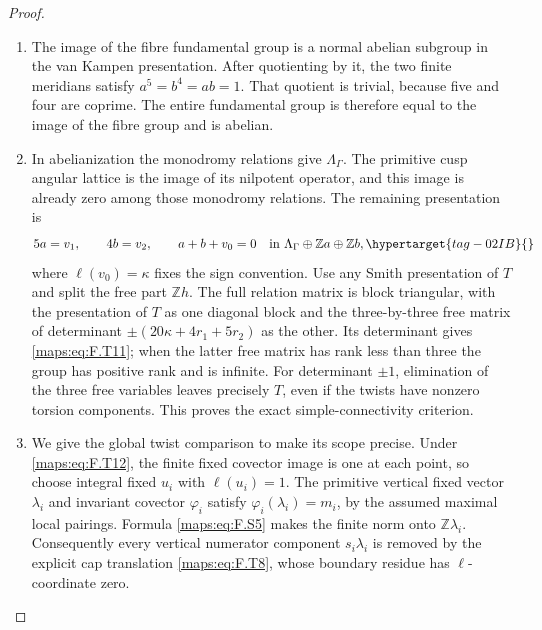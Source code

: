\documentclass[11pt,a4paper]{article}
\numberwithin{equation}{section}
\theoremstyle{definition}
\begin{document}
\begin{proof}
\begin{enumerate}[label=\arabic*.]
\item The image of the fibre fundamental group is a normal
abelian subgroup in the van Kampen presentation.
After quotienting by it, the two finite meridians satisfy
$a^5=b^4=ab=1$.
That quotient is trivial, because five and four are coprime.
The entire fundamental group is therefore equal to the
image of the fibre group and is abelian.

\item In abelianization the monodromy relations give
$\Lambda_\Gamma$.
The primitive cusp angular lattice is the image of its
nilpotent operator, and this image is already zero among
those monodromy relations.
The remaining presentation is
\begin{equation}
 5a=v_1,\qquad4b=v_2,\qquad a+b+v_0=0
 \quad\text{in }\Lambda_\Gamma\oplus\mathbb Za\oplus\mathbb Zb,
 \hypertarget{tag-02IB}{}\label{maps:eq:F.T13}
\end{equation}
where $\ell(v_0)=\kappa$ fixes the sign convention.
Use any Smith presentation of $T$ and split the free part
$\mathbb Zh$.
The full relation matrix is block triangular, with the
presentation of $T$ as one diagonal block and the
three-by-three free matrix of determinant
$\pm(20\kappa+4r_1+5r_2)$ as the other.
Its determinant gives \eqref{maps:eq:F.T11}; when the latter free
matrix has rank less than three the group has positive
rank and is infinite.
For determinant $\pm1$, elimination of the three free
variables leaves precisely $T$, even if the twists have
nonzero torsion components.
This proves the exact simple-connectivity criterion.

\item We give the global twist comparison to make its scope
precise.  Under \eqref{maps:eq:F.T12}, the finite fixed covector image
is one at each point, so choose integral fixed $u_i$ with
$\ell(u_i)=1$.  The primitive vertical fixed vector
$\lambda_i$ and invariant covector $\varphi_i$ satisfy
$\varphi_i(\lambda_i)=m_i$, by the assumed maximal local
pairings.  Formula \eqref{maps:eq:F.S5} makes the finite norm onto
$\mathbb Z\lambda_i$.
Consequently every vertical numerator component
$s_i\lambda_i$ is removed by the explicit cap translation
\eqref{maps:eq:F.T8}, whose boundary residue has $\ell$-coordinate zero.


\end{enumerate}
\end{proof}
\end{document}
